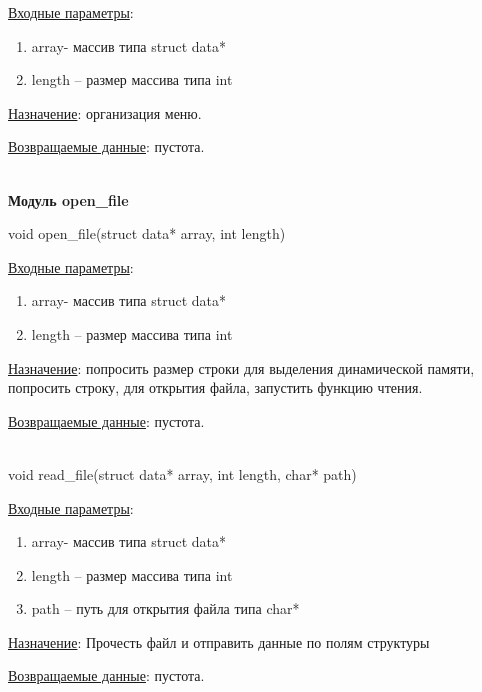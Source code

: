 \underline{Входные параметры}:

\begin{enumerate}
    \item array- массив типа struct data*
    \item length – размер массива типа int
\end{enumerate}

\underline{Назначение}: организация меню.

\underline{Возвращаемые данные}: пустота.

\hspace{0pt}\\



\textbf{Модуль open\_file}

void open\_file(struct data* array, int length)

\underline{Входные параметры}:

\begin{enumerate}
    \item array- массив типа struct data*
    \item length – размер массива типа int
\end{enumerate}

\underline{Назначение}: попросить размер строки для выделения динамической памяти, попросить строку, для открытия файла, запустить функцию чтения.

\underline{Возвращаемые данные}: пустота.

\hspace{0pt}\\



void read\_file(struct data* array, int length, char* path)

\underline{Входные параметры}:

\begin{enumerate}
    \item array- массив типа struct data*
    \item length – размер массива типа int
    \item path – путь для открытия файла типа char*
\end{enumerate}

\underline{Назначение}: Прочесть файл и отправить данные по полям структуры

\underline{Возвращаемые данные}: пустота.

\hspace{0pt}\\



